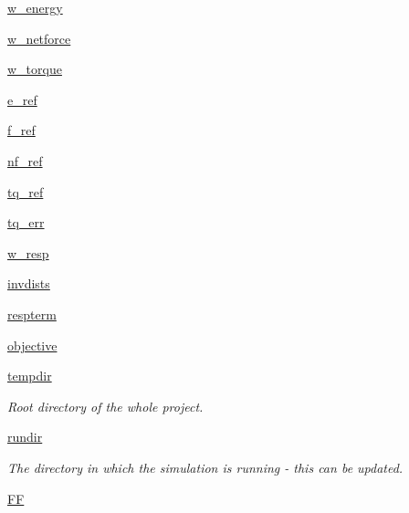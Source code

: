 \begin{DoxyCompactItemize}
\item 
\hyperlink{classforcebalance_1_1abinitio_1_1AbInitio_aa7f09e2ffc1253844c9f0736caf9b9e5}{w\-\_\-energy}
\item 
\hyperlink{classforcebalance_1_1abinitio_1_1AbInitio_af7cbfd50ca6a0b408c417e8d3bdb7cf3}{w\-\_\-netforce}
\item 
\hyperlink{classforcebalance_1_1abinitio_1_1AbInitio_a67643b98cce62c06c95f085d3a3e9722}{w\-\_\-torque}
\item 
\hyperlink{classforcebalance_1_1abinitio_1_1AbInitio_a71d13d3fabd98146c68bb5fc784f6732}{e\-\_\-ref}
\item 
\hyperlink{classforcebalance_1_1abinitio_1_1AbInitio_a6631ee11ee5646d97ea0fa5c9b22fc6a}{f\-\_\-ref}
\item 
\hyperlink{classforcebalance_1_1abinitio_1_1AbInitio_a5a77f4b99a5b01245ab0435d632122a1}{nf\-\_\-ref}
\item 
\hyperlink{classforcebalance_1_1abinitio_1_1AbInitio_aadda7244869b583a4533317615c421e1}{tq\-\_\-ref}
\item 
\hyperlink{classforcebalance_1_1abinitio_1_1AbInitio_ae60e834d5b5bf13f8fb70d403a97db28}{tq\-\_\-err}
\item 
\hyperlink{classforcebalance_1_1abinitio_1_1AbInitio_a176a442bd340d2f9b54319e76feb46ae}{w\-\_\-resp}
\item 
\hyperlink{classforcebalance_1_1abinitio_1_1AbInitio_aa01ee600ba0f429ffc81135af9d8109b}{invdists}
\item 
\hyperlink{classforcebalance_1_1abinitio_1_1AbInitio_a689e3849518b33539442a473a41ed32d}{respterm}
\item 
\hyperlink{classforcebalance_1_1abinitio_1_1AbInitio_acbbd447b9f66bc4699992f3b64bb256d}{objective}
\item 
\hyperlink{classforcebalance_1_1target_1_1Target_aa1f01b5b78db253b5b66384ed11ed193}{tempdir}
\begin{DoxyCompactList}\small\item\em Root directory of the whole project. \end{DoxyCompactList}\item 
\hyperlink{classforcebalance_1_1target_1_1Target_a6872de5b2d4273b82336ea5b0da29c9e}{rundir}
\begin{DoxyCompactList}\small\item\em The directory in which the simulation is running -\/ this can be updated. \end{DoxyCompactList}\item 
\hyperlink{classforcebalance_1_1target_1_1Target_a38a37919783141ea37fdcf8b00ce0aaf}{F\-F}

\end{DoxyCompactItemize}
